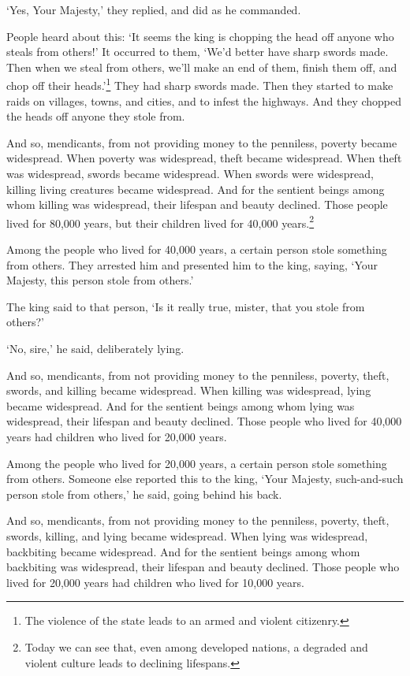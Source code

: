 \documentclass[12pt,openany]{book}%
\begin{document}
‘Yes, Your Majesty,’ they replied, and did as he commanded. 

People heard about this: ‘It seems the king is chopping the head off anyone who steals from others!’ It occurred to them, ‘We’d better have sharp swords made. Then when we steal from others, we’ll make an end of them, finish them off, and chop off their heads.’\footnote{The violence of the state leads to an armed and violent citizenry. } They had sharp swords made. Then they started to make raids on villages, towns, and cities, and to infest the highways. And they chopped the heads off anyone they stole from. 

And so, mendicants, from not providing money to the penniless, poverty became widespread. When poverty was widespread, theft became widespread. When theft was widespread, swords became widespread. When swords were widespread, killing living creatures became widespread. And for the sentient beings among whom killing was widespread, their lifespan and beauty declined. Those people lived for 80,000 years, but their children lived for 40,000 years.\footnote{Today we can see that, even among developed nations, a degraded and violent culture leads to declining lifespans. } 

Among the people who lived for 40,000 years, a certain person stole something from others. They arrested him and presented him to the king, saying, ‘Your Majesty, this person stole from others.’ 

The king said to that person, ‘Is it really true, mister, that you stole from others?’ 

‘No, sire,’ he said, deliberately lying. 

And so, mendicants, from not providing money to the penniless, poverty, theft, swords, and killing became widespread. When killing was widespread, lying became widespread. And for the sentient beings among whom lying was widespread, their lifespan and beauty declined. Those people who lived for 40,000 years had children who lived for 20,000 years. 

Among the people who lived for 20,000 years, a certain person stole something from others. Someone else reported this to the king, ‘Your Majesty, such-and-such person stole from others,’ he said, going behind his back. 

And so, mendicants, from not providing money to the penniless, poverty, theft, swords, killing, and lying became widespread. When lying was widespread, backbiting became widespread. And for the sentient beings among whom backbiting was widespread, their lifespan and beauty declined. Those people who lived for 20,000 years had children who lived for 10,000 years. 
\end{document}
